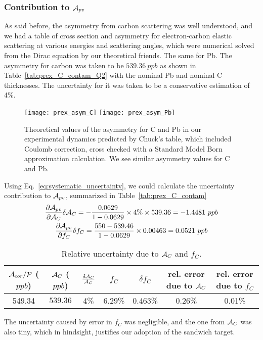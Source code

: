 \subsubsection{Contribution to $\mathcal{A}_{pv}$}
As said before, the asymmetry from carbon scattering was well understood, and
we had a table of cross section and asymmetry for electron-carbon elastic scattering
at various energies and scattering angles, which were numerical solved from the Dirac equation
by our theoretical friends. The same for Pb.
The asymmetry for carbon was taken to be $539.36 \ ppb$ as shown in Table~\ref{tab:prex_C_contam_Q2}
with the nominal Pb and nominal C thicknesses. The uncertainty for it was taken
to be a conservative estimation of 4\%.
\begin{figure}
    \centering
    \texttt{[image: prex\_asym\_C]}
    \texttt{[image: prex\_asym\_Pb]}
    \caption{Theoretical values of the asymmetry for C and Pb in our experimental 
    dynamics predicted by Chuck's table, which included Coulomb correction, cross
    checked with a Standard Model Born approximation calculation. We see similar
    asymmetry values for C and Pb.}
    \label{prex_asym}
\end{figure}
Using Eq.~\ref{eq:systematic_uncertainty}, we could calculate the uncertainty
contribution to $\mathcal{A}_{pv}$, summarized in Table~\ref{tab:prex_C_contam}
\begin{equation*}
    \begin{gathered}
	\frac{\partial \mathcal{A}_{pv}}{\partial \mathcal{A}_C} \delta \mathcal{A}_C = 
	-\frac{0.0629}{1 - 0.0629} \times 4\% \times 539.36 = -1.4481\ ppb   \\
	\frac{\partial \mathcal{A}_{pv}}{\partial f_C}\delta f_C =
	\frac{550 - 539.46}{1 - 0.0629} \times 0.00463 = 0.0521\ ppb	\\
    \end{gathered}
\end{equation*}

\begin{table}
    \centering
    \begin{tabular}{c | c c | c c | c c}
        \hline
	\thead{$\mathcal{A}_{cor}/\mathcal{P}$ \\ ($ppb$)}   & \thead{$\mathcal{A}_C$ \\ ($ppb$)}   & $\frac{\delta\mathcal{A}_C}{\mathcal{A}_C}$   & $f_C$ & $\delta f_C$  & \thead{rel. error \\ due to $\mathcal{A}_C$ } & \thead{rel. error \\ due to $f_C$}\\
        \hline
	549.34	& $539.36$  & 4\%   & 6.29\%	& 0.463\%   & 0.26\%	& 0.01\% \\
        \hline
    \end{tabular}
    \caption{Relative uncertainty due to $\mathcal{A}_C$ and $f_C$.}
    \label{tab:prex_C_contan}
\end{table}
The uncertainty caused by error in $f_C$ was negligible, and the one from $\mathcal{A}_C$
was also tiny, which in hindsight, justifies our adoption of the sandwich target.

